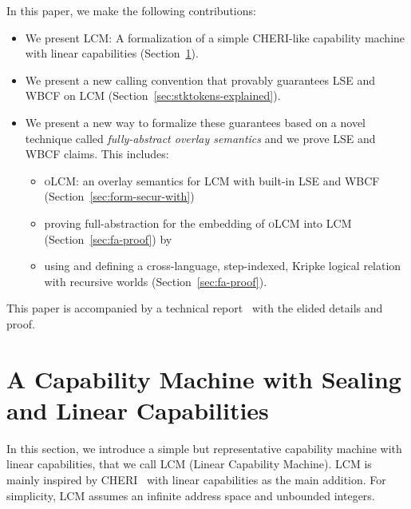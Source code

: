 \documentclass[acmsmall,screen]{acmart}\settopmatter{}
\newcommand{\trgcm}{\textsc{LCM}}
\newcommand{\srccm}{\textsc{oLCM}}
\begin{document}
In this paper, we make the following contributions:
\begin{itemize}
\item We present \trgcm{}: A formalization of a simple CHERI-like capability machine with linear capabilities (Section~\ref{sec:cap-mach-w-seal-and-lin}).
\item We present a new calling convention \stktokens{} that provably guarantees LSE and WBCF on \trgcm{} (Section~\ref{sec:stktokens-explained}).
\item We present a new way to formalize these guarantees based on a novel
  technique called \textit{fully-abstract overlay semantics} and we prove LSE
  and WBCF claims. This includes:
  \begin{itemize}
  \item \srccm{}: an overlay semantics for \trgcm{} with built-in LSE and WBCF (Section~\ref{sec:form-secur-with})
  \item proving full-abstraction for the embedding of \srccm{} into \trgcm{} (Section~\ref{sec:fa-proof}) by
  \item using and defining a cross-language, step-indexed, Kripke logical relation with recursive worlds (Section~\ref{sec:fa-proof}).
  \end{itemize}
\end{itemize}
This paper is accompanied by a technical report~\citep{technical_report} with the elided details and proof.


\section{A Capability Machine with Sealing and Linear Capabilities}
\label{sec:cap-mach-w-seal-and-lin}
In this section, we introduce a simple but representative capability machine with linear capabilities, that we call \trgcm{} (Linear Capability Machine).
\trgcm{} is mainly inspired by CHERI~\citep{watson_cheri:_2015} with linear capabilities as the main addition.
For simplicity, \trgcm{} assumes an infinite address space and unbounded integers.
\end{document}
